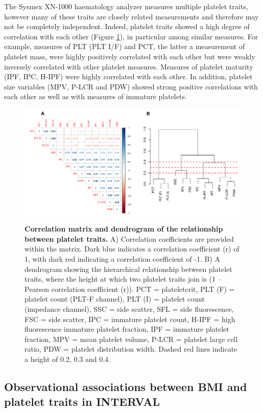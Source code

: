 \documentclass[11pt,twoside]{bristolthesis}
\begin{document}
The Sysmex XN-1000 haematology analyzer measures multiple platelet traits, however many of these traits are closely related measurements and therefore may not be completely independent. Indeed, platelet traits showed a high degree of correlation with each other (Figure \ref{fig:Corr-mat-dend}), in particular among similar measures. For example, measures of PLT (PLT I/F) and PCT, the latter a measurement of platelet mass, were highly positively correlated with each other but were weakly inversely correlated with other platelet measures. Measures of platelet maturity (IPF, IPC, H-IPF) were highly correlated with each other. In addition, platelet size variables (MPV, P-LCR and PDW) showed strong positive correlations with each other as well as with measures of immature platelets.




\begin{figure}

{\centering \includegraphics[width=0.95\linewidth]{figure/BMI_platelets/Corrmatrix_dendrogram} 

}

\caption[Correlation matrix and dendrogram of the relationship between platelet traits]{\textbf{Correlation matrix and dendrogram of the relationship between platelet traits.} A) Correlation coefficients are provided within the matrix. Dark blue indicates a correlation coefficient (r) of 1, with dark red indicating a correlation coefficient of -1. B) A dendrogram showing the hierarchical relationship between platelet traits, where the height at which two platelet traits join is (1 -- Pearson correlation coefficient (r)). PCT = plateletcrit, PLT (F) = platelet count (PLT-F channel), PLT (I) = platelet count (impedance channel), SSC = side scatter, SFL = side fluorescence, FSC = side scatter, IPC = immature platelet count, H-IPF = high fluorescence immature platelet fraction, IPF = immature platelet fraction, MPV = mean platelet volume, P-LCR = platelet large cell ratio, PDW = platelet distribution width. Dashed red lines indicate a height of 0.2, 0.3 and 0.4.}\label{fig:Corr-mat-dend}
\end{figure}
\hypertarget{observational-associations-between-bmi-and-platelet-traits-in-interval}{%
\subsection{Observational associations between BMI and platelet traits in INTERVAL}\label{observational-associations-between-bmi-and-platelet-traits-in-interval}}
\end{document}
